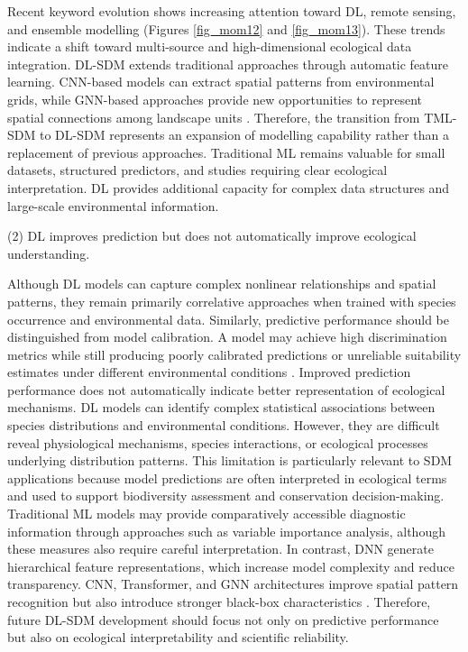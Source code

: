 \documentclass[authoryear,preprint,review,12pt]{elsarticle}
\begin{document}
Recent keyword evolution shows increasing attention toward DL, remote sensing, and ensemble modelling (Figures \ref{fig_mom12} and \ref{fig_mom13}). These trends indicate a shift toward multi-source and high-dimensional ecological data integration. DL-SDM extends traditional approaches through automatic feature learning. CNN-based models can extract spatial patterns from environmental grids, while GNN-based approaches provide new opportunities to represent spatial connections among landscape units \citep{deneu2021convolutional, wu2025gnn}. Therefore, the transition from TML-SDM to DL-SDM represents an expansion of modelling capability rather than a replacement of previous approaches. Traditional ML remains valuable for small datasets, structured predictors, and studies requiring clear ecological interpretation. DL provides additional capacity for complex data structures and large-scale environmental information.

(2) DL improves prediction but does not automatically improve ecological understanding.

Although DL models can capture complex nonlinear relationships and spatial patterns, they remain primarily correlative approaches when trained with species occurrence and environmental data. Similarly, predictive performance should be distinguished from model calibration. A model may achieve high discrimination metrics while still producing poorly calibrated predictions or unreliable suitability estimates under different environmental conditions \citep{ryo2021explainable}. Improved prediction performance does not automatically indicate better representation of ecological mechanisms. DL models can identify complex statistical associations between species distributions and environmental conditions. However, they are difficult reveal physiological mechanisms, species interactions, or ecological processes underlying distribution patterns. This limitation is particularly relevant to SDM applications because model predictions are often interpreted in ecological terms and used to support biodiversity assessment and conservation decision-making. Traditional ML models may provide comparatively accessible diagnostic information through approaches such as variable importance analysis, although these measures also require careful interpretation. In contrast, DNN generate hierarchical feature representations, which increase model complexity and reduce transparency. CNN, Transformer, and GNN architectures improve spatial pattern recognition but also introduce stronger black-box characteristics \citep{zhang2020three, hu2025introduction, wu2025gnn}. Therefore, future DL-SDM development should focus not only on predictive performance but also on ecological interpretability and scientific reliability.
\end{document}
